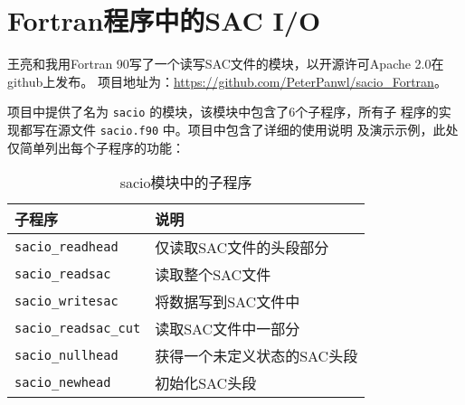 \section{Fortran程序中的SAC I/O}
王亮和我用Fortran 90写了一个读写SAC文件的模块，以开源许可Apache 2.0在github上发布。
项目地址为：\url{https://github.com/PeterPanwl/sacio_Fortran}。

项目中提供了名为 \texttt{sacio} 的模块，该模块中包含了6个子程序，所有子
程序的实现都写在源文件 \texttt{sacio.f90} 中。项目中包含了详细的使用说明
及演示示例，此处仅简单列出每个子程序的功能：

\begin{table}[H]
\centering
\caption{sacio模块中的子程序}
\label{table:sacio_Fortran}
\begin{tabular}{ll}
\toprule
子程序      &   说明        \\
\midrule
\verb|sacio_readhead|      &   仅读取SAC文件的头段部分 \\
\verb|sacio_readsac|       &   读取整个SAC文件 \\
\verb|sacio_writesac|      &   将数据写到SAC文件中 \\
\verb|sacio_readsac_cut|   &   读取SAC文件中一部分 \\
\verb|sacio_nullhead|      &   获得一个未定义状态的SAC头段\\
\verb|sacio_newhead|       &   初始化SAC头段\\
\bottomrule
\end{tabular}
\end{table}
